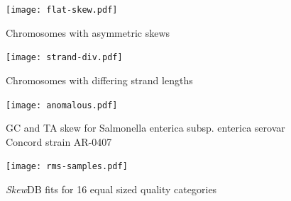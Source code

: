 \documentclass[fleqn,10pt]{wlscirep}
\begin{document}
{\begin{figure}[ht]
\centering
\texttt{[image: flat-skew.pdf]}
\caption{Chromosomes with asymmetric skews}
\label{fig:asym-skew}
\end{figure}

\begin{figure}[ht]
\centering
\texttt{[image: strand-div.pdf]}
\caption{Chromosomes with differing strand lengths}
\label{fig:strand-div}
\end{figure}

\begin{figure}[ht]
\centering
\texttt{[image: anomalous.pdf]}
\caption{GC and TA skew for Salmonella enterica subsp. enterica serovar Concord strain AR-0407}
\label{fig:anomalous}
\end{figure}

\begin{figure}[tbhp]
\centering
\texttt{[image: rms-samples.pdf]}
\caption{\emph{Skew}DB fits for 16 equal sized quality categories}
\label{fig:rms-samples}
\end{figure}
}
\end{document}

